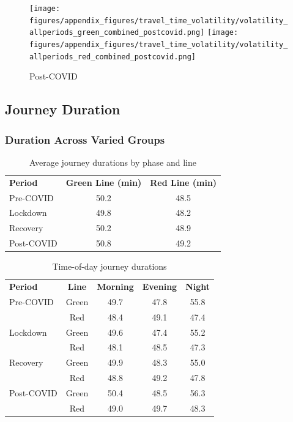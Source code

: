\vspace{5cm}
\begin{figure}[H]
  \centering
  \texttt{[image: figures/appendix\_figures/travel\_time\_volatility/volatility\_allperiods\_green\_combined\_postcovid.png]}
  \texttt{[image: figures/appendix\_figures/travel\_time\_volatility/volatility\_allperiods\_red\_combined\_postcovid.png]}
  \caption{Post-COVID}
\end{figure}

\newpage
\subsection*{Journey Duration}

\subsubsection*{Duration Across Varied Groups}

\begin{table}[H]
  \centering
  \caption{Average journey durations by phase and line}
  \label{tab:duration_by_phase}
  \begin{tabular}{lcc}
    \textbf{Period} & \textbf{Green Line (min)} & \textbf{Red Line (min)} \\
    Pre-COVID & 50.2 & 48.5 \\
    Lockdown  & 49.8 & 48.2 \\
    Recovery  & 50.2 & 48.9 \\
    Post-COVID & 50.8 & 49.2 \\
  \end{tabular}
\end{table}

\begin{table}[H]
  \centering
  \caption{Time-of-day journey durations }
  \label{tab:duration_by_time}
  \begin{tabular}{lcccc}
    \textbf{Period} & \textbf{Line} & \textbf{Morning} & \textbf{Evening} & \textbf{Night} \\
    Pre-COVID & Green & 49.7 & 47.8 & 55.8 \\
              & Red   & 48.4 & 49.1 & 47.4 \\
    Lockdown  & Green & 49.6 & 47.4 & 55.2 \\
              & Red   & 48.1 & 48.5 & 47.3 \\
    Recovery  & Green & 49.9 & 48.3 & 55.0 \\
              & Red   & 48.8 & 49.2 & 47.8 \\
    Post-COVID & Green & 50.4 & 48.5 & 56.3 \\
              & Red   & 49.0 & 49.7 & 48.3 \\
  \end{tabular}
\end{table}

